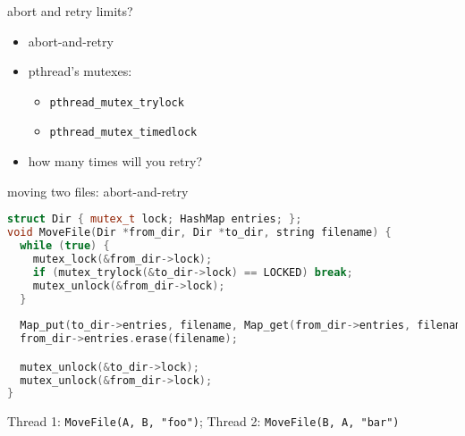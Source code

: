 \begin{frame}{abort and retry limits?}
\begin{itemize}
\item abort-and-retry
\item pthread's mutexes:
    \begin{itemize}
        \item \texttt{pthread\_mutex\_trylock} 
        \item \texttt{pthread\_mutex\_timedlock}
    \end{itemize}
\item how many times will you retry?
\end{itemize}
\end{frame}

\begin{frame}[fragile,label=moveFileWithRetry]{moving two files: abort-and-retry}
\begin{lstlisting}[language=C++,style=smaller]
struct Dir { mutex_t lock; HashMap entries; };
void MoveFile(Dir *from_dir, Dir *to_dir, string filename) {
  while (true) {
    mutex_lock(&from_dir->lock);
    if (mutex_trylock(&to_dir->lock) == LOCKED) break;
    mutex_unlock(&from_dir->lock);
  }
    
  Map_put(to_dir->entries, filename, Map_get(from_dir->entries, filename));
  from_dir->entries.erase(filename);

  mutex_unlock(&to_dir->lock);
  mutex_unlock(&from_dir->lock);
}
\end{lstlisting}
Thread 1: \texttt{MoveFile(A, B, "foo")}; Thread 2: \texttt{MoveFile(B, A, "bar")} 
\end{frame}

